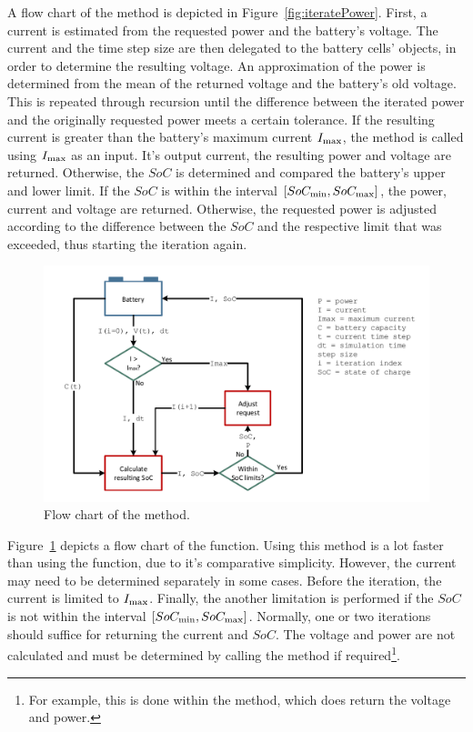 A flow chart of the  method is depicted in Figure~\ref{fig:iteratePower}. First, a current is estimated from the requested power and the battery's voltage. The current and the time step size are then delegated to the battery cells'  objects, in order to determine the resulting voltage. An approximation of the power is determined from the mean of the returned voltage and the battery's old voltage. This is repeated through recursion until the difference between the iterated power and the originally requested power meets a certain tolerance. If the resulting current is greater than the battery's maximum current $I_\text{max}$, the  method is called using $I_\text{max}$ as an input. It's output current, the resulting power and voltage are returned. Otherwise, the $SoC$ is determined and compared the battery's upper and lower limit. If the $SoC$ is within the interval $[SoC_\text{min}, SoC_\text{max}]$, the power, current and voltage are returned. Otherwise, the requested power is adjusted according to the difference between the $SoC$ and the respective limit that was exceeded, thus starting the iteration again. \\
\begin{figure}[t!]
	\captionsetup{type=figure}
	\centering
	\includegraphics[width=\textwidth]{iterateCurrent.pdf}
	\caption[Flow chart of the  method]{Flow chart of the  method.}
	\label{fig:iterateCurrent}
\end{figure}
Figure~\ref{fig:iterateCurrent} depicts a flow chart of the  function. Using this method is a lot faster than using the  function, due to it's comparative simplicity. However, the current may need to be determined separately in some cases. Before the iteration, the current is limited to $I_\text{max}$. Finally, the another limitation is performed if the $SoC$ is not within the interval $[SoC_\text{min}, SoC_\text{max}]$. Normally, one or two iterations should suffice for returning the current and $SoC$. The voltage and power are not calculated and must be determined by calling the  method if required\footnote{For example, this is done within the  method, which does return the voltage and power.}.\\
